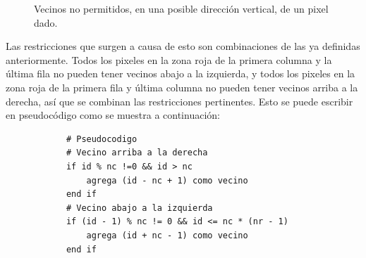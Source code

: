\begin{enumerate}
\begin{solution}
\begin{figure}[ht!]
\begin{subfigure}{0.4\textwidth}
            \end{subfigure}
            \caption{Vecinos no permitidos, en una posible dirección vertical, de un pixel dado.}
            \label{fig:vecinos_diag_op1}
        \end{figure}

        Las restricciones que surgen a causa de esto son combinaciones de las ya definidas anteriormente. Todos los pixeles en la zona roja de la primera columna y la última fila no pueden tener vecinos abajo a la izquierda, y todos los pixeles en la zona roja de la primera fila y última columna no pueden tener vecinos arriba a la derecha, así que se combinan las restricciones pertinentes. Esto se puede escribir en pseudocódigo como se muestra a continuación:
        \begin{verbatim}
            # Pseudocodigo
            # Vecino arriba a la derecha
            if id % nc !=0 && id > nc
                agrega (id - nc + 1) como vecino
            end if
            # Vecino abajo a la izquierda
            if (id - 1) % nc != 0 && id <= nc * (nr - 1)
                agrega (id + nc - 1) como vecino
            end if
        \end{verbatim}


\end{solution}
\end{enumerate}
